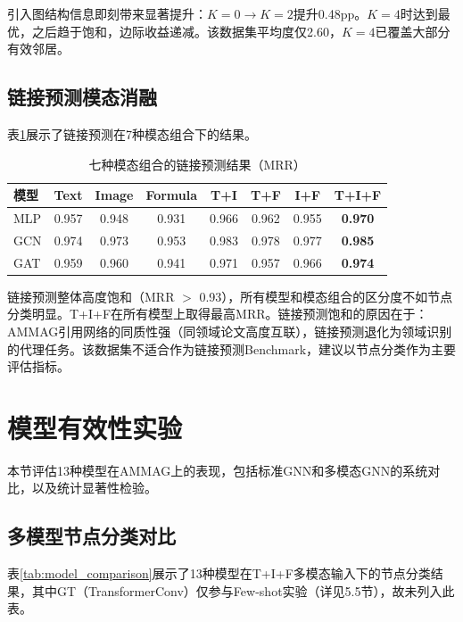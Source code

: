 引入图结构信息即刻带来显著提升：$K=0 \to K=2$提升0.48pp。$K=4$时达到最优，之后趋于饱和，边际收益递减。该数据集平均度仅2.60，$K=4$已覆盖大部分有效邻居。

\subsection{链接预测模态消融}

表\ref{tab:lp_7modality}展示了链接预测在7种模态组合下的结果。

\begin{table}[htbp]
  \centering
  \caption{七种模态组合的链接预测结果（MRR）}
  \label{tab:lp_7modality}
  \begin{tabular}{lccccccc}
    \toprule
    模型 & Text & Image & Formula & T+I & T+F & I+F & T+I+F \\
    \midrule
    MLP & 0.957 & 0.948 & 0.931 & 0.966 & 0.962 & 0.955 & \textbf{0.970} \\
    GCN & 0.974 & 0.973 & 0.953 & 0.983 & 0.978 & 0.977 & \textbf{0.985} \\
    GAT & 0.959 & 0.960 & 0.941 & 0.971 & 0.957 & 0.966 & \textbf{0.974} \\
    \bottomrule
  \end{tabular}
\end{table}

链接预测整体高度饱和（MRR $>$ 0.93），所有模型和模态组合的区分度不如节点分类明显。T+I+F在所有模型上取得最高MRR。链接预测饱和的原因在于：AMMAG引用网络的同质性强（同领域论文高度互联），链接预测退化为领域识别的代理任务。该数据集不适合作为链接预测Benchmark，建议以节点分类作为主要评估指标。

\section{模型有效性实验}

本节评估13种模型在AMMAG上的表现，包括标准GNN和多模态GNN的系统对比，以及统计显著性检验。

\subsection{多模型节点分类对比}

表\ref{tab:model_comparison}展示了13种模型在T+I+F多模态输入下的节点分类结果，其中GT（TransformerConv）仅参与Few-shot实验（详见5.5节），故未列入此表。

